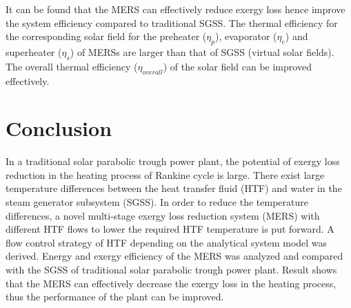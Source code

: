 It can be found that the MERS can effectively reduce exergy loss hence improve the system efficiency compared to traditional SGSS. The thermal efficiency for the corresponding solar field for the preheater ($\eta_p$), evaporator ($\eta_e$) and superheater ($\eta_s$) of MERSs are larger than that of SGSS (virtual solar fields).
The overall thermal efficiency ($\eta_{overall}$) of the solar field can be improved effectively.

\section{Conclusion}
In a traditional solar parabolic trough power plant, the potential of exergy loss reduction in the heating process of Rankine cycle is large. There exist large temperature differences between the heat transfer fluid (HTF) and water in the steam generator subsystem (SGSS). In order to reduce the temperature differences, a novel multi-stage exergy loss reduction system (MERS) with different HTF flows to lower the required HTF temperature is put forward. A flow control strategy of HTF depending on the analytical system model was derived. Energy and exergy efficiency of the MERS was analyzed and compared with the SGSS of traditional solar parabolic trough power plant. Result shows that the MERS can effectively decrease the exergy loss in the heating process, thus the performance of the plant can be improved.
